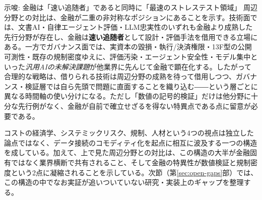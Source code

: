 \begin{insight}{示唆: 金融は「速い追随者」であると同時に「最速のストレステスト領域」}
周辺分野との対比は、金融が二重の非対称なポジションにあることを示す。技術面では、文書AI・自律エージェント評価・LLM忠実性のいずれも金融より成熟した先行分野が存在し、金融は\textbf{速い追随者}として設計・評価手法を借用できる立場にある。一方でガバナンス面では、実資本の毀損・執行/決済権限・13F型の公開可測性・既存の規制密度ゆえに、評価汚染・エージェント安全性・モデル集中といった\emph{汎用AIの未解決課題}が他業界に先んじて金融で顕在化する。したがって合理的な戦略は、借りられる技術は周辺分野の成熟を待って借用しつつ、ガバナンス・検証層では自ら先頭で問題に直面することを織り込む――という層ごとに異なる時間軸の使い分けになる。ただし「数値の記号的検証」だけは他分野に十分な先行例がなく、金融が自前で確立せざるを得ない特異点である点に留意が必要である。
\end{insight}

コストの経済学、システミックリスク、規制、人材という4つの視点は独立した論点ではなく、データ接続のコモディティ化を起点に相互に波及する一つの構造を成している。加えて、上で見た周辺分野との対比は、この構造の大半が金融固有ではなく業界横断で共有されること、そして金融の特異性が数値検証と規制密度という2点に凝縮されることを示している。次節（第\ref{sec:open-gaps}部）では、この構造の中でなお実証が追いついていない研究・実装上のギャップを整理する。
